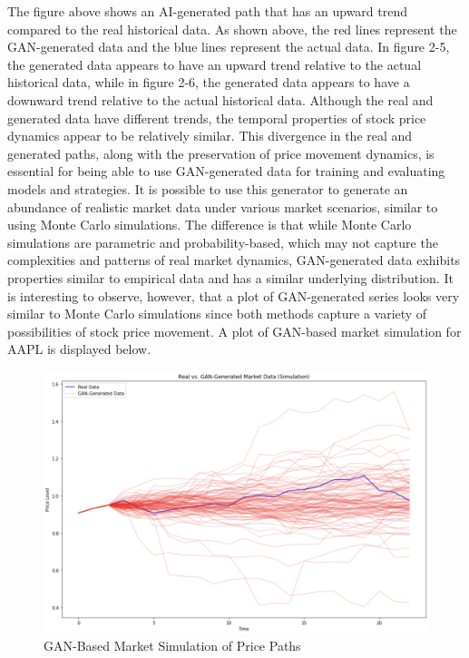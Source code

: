 \noindent The figure above shows an AI-generated path that has an upward trend compared to the real historical data. As shown above, the red lines represent the GAN-generated data and the blue lines represent the actual data. In figure 2-5, the generated data appears to have an upward trend relative to the actual historical data, while in figure 2-6, the generated data appears to have a downward trend relative to the actual historical data. Although the real and generated data have different trends, the temporal properties of stock price dynamics appear to be relatively similar. This divergence in the real and generated paths, along with the preservation of price movement dynamics, is essential for being able to use GAN-generated data for training and evaluating models and strategies. It is possible to use this generator to generate an abundance of realistic market data under various market scenarios, similar to using Monte Carlo simulations. The difference is that while Monte Carlo simulations are parametric and probability-based, which may not capture the complexities and patterns of real market dynamics, GAN-generated data exhibits properties similar to empirical data and has a similar underlying distribution. It is interesting to observe, however, that a plot of GAN-generated series looks very similar to Monte Carlo simulations since both methods capture a variety of possibilities of stock price movement. A plot of GAN-based market simulation for AAPL is displayed below.
\begin{figure}[h]
\centering
\includegraphics[width=14cm]{templates/assets/gan/gan_simulation.png}
\caption{GAN-Based Market Simulation of Price Paths}
\end{figure}

